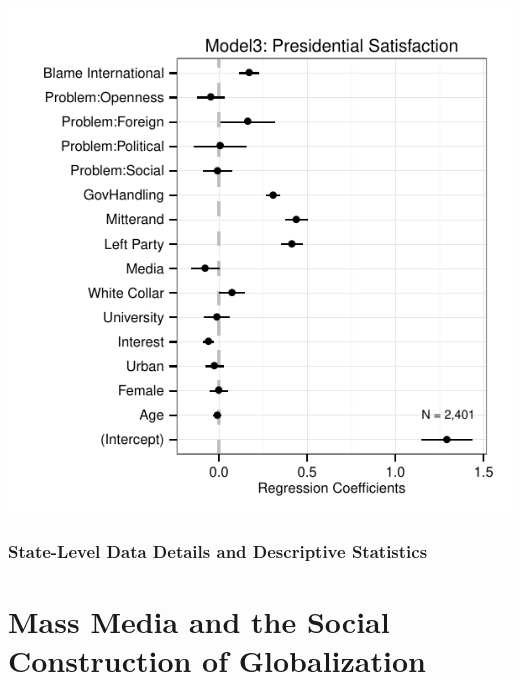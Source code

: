 \documentclass[12pt]{report}
\begin{document}
\begin{center}
\includegraphics{article1_pressat_coefs}
\par\end{center}

\begin{center}

\par\end{center}

\subsection*{State-Level Data Details and Descriptive Statistics}

\begin{flushleft}

\par\end{flushleft}

\begin{center}

\par\end{center}


\chapter{Mass Media and the Social Construction of Globalization}
\end{document}

